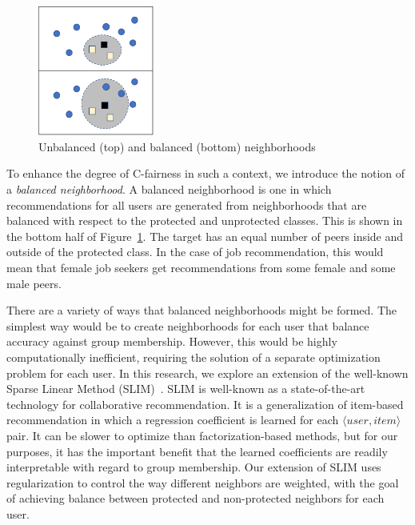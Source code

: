 \begin{figure}[bh]
    \centering
    \includegraphics[width=1.5in]{imgs/bln/neighborhood.pdf}
    \caption{Unbalanced (top) and balanced (bottom) neighborhoods}
    \label{fig:neighbor}
\end{figure}

To enhance the degree of C-fairness in such a context, we introduce the notion of a \textit{balanced neighborhood}. A balanced neighborhood is one in which recommendations for all users are generated from neighborhoods that are balanced with respect to the protected and unprotected classes. This is shown in the bottom half of Figure~\ref{fig:neighbor}. The target has an equal number of peers inside and outside of the protected class. In the case of job recommendation, this would mean that female job seekers get recommendations from some female and some male peers.

There are a variety of ways that balanced neighborhoods might be formed. The simplest way would be to create neighborhoods for each user that balance accuracy against group membership. However, this would be highly computationally inefficient, requiring the solution of a separate optimization problem for each user. In this research, we explore an extension of the well-known Sparse Linear Method (SLIM)~\cite{ning2011slim}. SLIM is well-known as a state-of-the-art technology for collaborative recommendation. It is a generalization of item-based recommendation in which a regression coefficient is learned for each $\langle user, item \rangle$ pair. It can be slower to optimize than factorization-based methods, but for our purposes, it has the important benefit that the learned coefficients are readily interpretable with regard to group membership. Our extension of SLIM uses regularization to control the way different neighbors are weighted, with the goal of achieving balance between protected and non-protected neighbors for each user.

